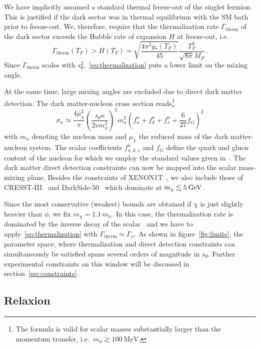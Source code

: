 \documentclass[preprintnumbers,twocolumn,aps,floats,nofootinbib]{revtex4-1}
\newcommand{\eVdist}{\kern-0.06em}
\newcommand{\gev}{\:\text{Ge\eVdist V}}
\begin{document}
We have implicitly assumed a standard thermal freeze-out of the singlet fermion. This is justified if the dark sector was in thermal equilibrium with the SM bath prior to freeze-out. We, therefore, require that the thermalization rate $\Gamma_{\text{therm}}$ of the dark sector exceeds the Hubble rate of expansion $H$ at freeze-out, i.e.
\begin{equation}\label{eq:thermalization}
 \Gamma_{\text{therm}}(T_F) > H(T_F)= \sqrt{\frac{4\pi^3 g_*(T_F)}{45}}\frac{T_F^2}{\sqrt{8\pi} M_P}\,.
\end{equation}
Since $\Gamma_{\text{therm}}$ scales with $s_\theta^2$,~\eqref{eq:thermalization} puts a lower limit on the mixing angle.

At the same time, large mixing angles are excluded due to direct dark matter detection. The dark matter-nucleon cross section reads\footnote{The formula is valid for scalar masses substantially larger than the momentum transfer, i.e.\ $m_\phi\gtrsim 100\:\text{MeV}$.}~\cite{Schmidt-Hoberg:2013hba}
\begin{equation}
 \sigma_n\simeq \frac{4\mu_\chi^2}{\pi}\left(\frac{s_{\theta}\kappa}{2 v m_\phi^2}\right)^2 \! m_n^2 \left(f^n_u+f^n_d+f^n_s+\frac{6}{27} f_G\right)^2
\end{equation}
with $m_n$ denoting the nucleon mass and $\mu_\chi$ the reduced mass of the dark matter-nucleon system. The scalar coefficients $f_{u,d,s}^n$ and $f_G$ define the quark and gluon content of the nucleon for which we employ the standard values given in~\cite{Belanger:2013oya}. The dark matter direct detection constraints can now be mapped into the scalar mass-mixing plane. Besides the constraints of XENON1T~\cite{Aprile:2018dbl}, we also include those of CRESST-III~\cite{Petricca:2017zdp} and DarkSide-50~\cite{Agnes:2018ves} which dominate at $m_\chi\lesssim 5\gev$. 

Since the most conservative (weakest) bounds are obtained if $\chi$ is just slightly heavier than $\phi$, we fix $m_\chi=1.1\,m_\phi$. In this case, the thermalization rate is dominated by the inverse decay of the scalar~\cite{Evans:2017kti} and we have to apply~\eqref{eq:thermalization} with $\Gamma_{\text{therm}}\simeq\Gamma_\phi$. As shown in figure~\ref{fig:limits}, the parameter space, where thermalization and direct detection constraints can simultaneously be satisfied spans several orders of magnitude in $s_\theta$. Further experimental constraints on this window will be discussed in section~\ref{sec:constraints}. 

\subsection{Relaxion}\label{sec:relaxion}
\end{document}
